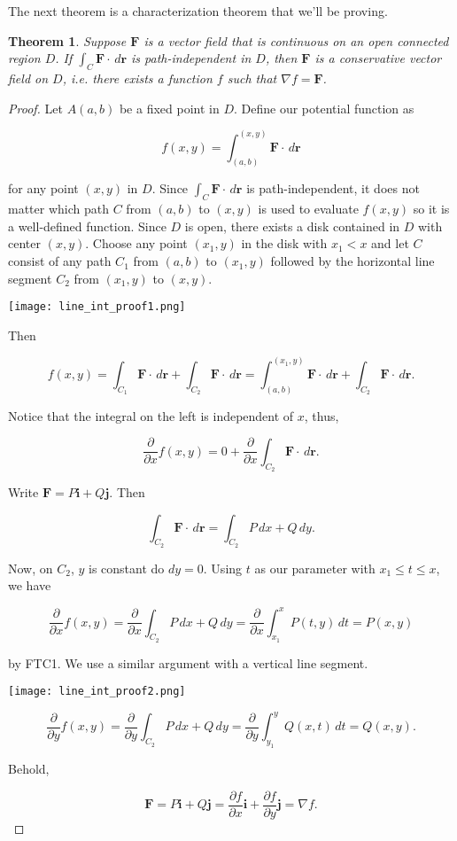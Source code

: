 \documentclass[11pt,oneside,english]{amsart}
\newtheorem{theorem}{Theorem}
\theoremstyle{definition}
\newcommand{\pp}[2]{\frac{\partial{#1}}{\partial{#2}}}
\begin{document}
The next theorem is a characterization theorem that we'll be proving.

\begin{theorem}
Suppose $\mathbf{F}$ is a vector field that is continuous on an open connected region $D$. If $\int_C\mathbf{F}\cdot\,d\mathbf{r}$ is path-independent in $D$, then $\mathbf{F}$ is a conservative vector field on $D$, i.e. there exists a function $f$ such that $\nabla f=\mathbf{F}$.
\end{theorem}

\begin{proof}
Let $A(a,b)$ be a fixed point in $D$. Define our potential function as

\[
f(x,y)=\int_{(a,b)}^{(x,y)}\mathbf{F}\cdot\,d\mathbf{r}
\]

for any point $(x,y)$ in $D$. Since $\int_C\mathbf{F}\cdot\,d\mathbf{r}$ is path-independent, it does not matter which path $C$ from $(a,b)$ to $(x,y)$ is used to evaluate $f(x,y)$ so it is a well-defined function. Since $D$ is open, there exists a disk contained in $D$ with center $(x,y)$. Choose any point $(x_1,y)$ in the disk with $x_1<x$ and let $C$ consist of any path $C_1$ from $(a,b)$ to $(x_1,y)$ followed by the horizontal line segment $C_2$ from $(x_1,y)$ to $(x,y)$.

\begin{center}
\texttt{[image: line\_int\_proof1.png]}
\end{center}

Then

\[
f(x,y)=\int_{C_1}\mathbf{F}\cdot\,d\mathbf{r}+\int_{C_2}\mathbf{F}\cdot\,d\mathbf{r}=\int_{(a,b)}^{(x_1,y)}\mathbf{F}\cdot\,d\mathbf{r}+\int_{C_2}\mathbf{F}\cdot\,d\mathbf{r}.
\]

Notice that the integral on the left is independent of $x$, thus,

\[
\pp{}{x}f(x,y)=0+\pp{}{x}\int_{C_2}\mathbf{F}\cdot\,d\mathbf{r}.
\]

Write $\mathbf{F}=P\mathbf{i}+Q\mathbf{j}$. Then

\[
\int_{C_2}\mathbf{F}\cdot\,d\mathbf{r}=\int_{C_2}P\,dx+Q\,dy.
\]

Now, on $C_2$, $y$ is constant do $dy=0$. Using $t$ as our parameter with $x_1\leq t\leq x$, we have

\[
\pp{}{x}f(x,y)=\pp{}{x}\int_{C_2}P\,dx+Q\,dy=\pp{}{x}\int_{x_1}^xP(t,y)\,dt=P(x,y)
\]

by FTC1. We use a similar argument with a vertical line segment.

\begin{center}
\texttt{[image: line\_int\_proof2.png]}
\end{center}

\[
\pp{}{y}f(x,y)=\pp{}{y}\int_{C_2}P\,dx+Q\,dy=\pp{}{y}\int_{y_1}^yQ(x,t)\,dt=Q(x,y).
\]

Behold,

\[
\mathbf{F}=P\mathbf{i}+Q\mathbf{j}=\pp{f}{x}\mathbf{i}+\pp{f}{y}\mathbf{j}=\nabla f.
\]
\end{proof}
\end{document}
